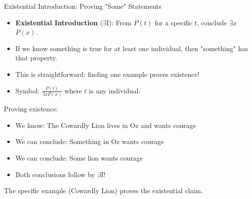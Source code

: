 \documentclass{beamer}
\begin{document}
	\begin{frame}{Existential Introduction: Proving "Some" Statements}
		\begin{itemize}
			\item \textbf{Existential Introduction} ($\exists$I): From $P(t)$ for a specific $t$, conclude $\exists x$ $P(x)$.
			\item If we know something is true for at least one individual, then "something" has that property.
			\item This is straightforward: finding one example proves existence!
			\item Symbol: $\frac{P(t)}{\exists x P(x)}$ where $t$ is any individual.
		\end{itemize}
		
		\begin{example}
			Proving existence:
			\begin{itemize}
				\item We know: The Cowardly Lion lives in Oz and wants courage
				\item We can conclude: Something in Oz wants courage
				\item We can conclude: Some lion wants courage  
				\item Both conclusions follow by $\exists$I!
			\end{itemize}
			The specific example (Cowardly Lion) proves the existential claim.
		\end{example}
	\end{frame}
	
\end{document}
